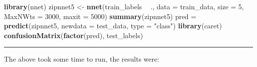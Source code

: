 \documentclass[]{article}
\newenvironment{Shaded}{\begin{snugshade}}{\end{snugshade}}
\newcommand{\KeywordTok}[1]{\textcolor[rgb]{0.13,0.29,0.53}{\textbf{#1}}}
\newcommand{\DataTypeTok}[1]{\textcolor[rgb]{0.13,0.29,0.53}{#1}}
\newcommand{\DecValTok}[1]{\textcolor[rgb]{0.00,0.00,0.81}{#1}}
\newcommand{\StringTok}[1]{\textcolor[rgb]{0.31,0.60,0.02}{#1}}
\newcommand{\OperatorTok}[1]{\textcolor[rgb]{0.81,0.36,0.00}{\textbf{#1}}}
\newcommand{\NormalTok}[1]{#1}
\begin{document}
\begin{Shaded}
\begin{Highlighting}[]
\KeywordTok{library}\NormalTok{(nnet)}
\NormalTok{zipnnet5 <-}\StringTok{ }\KeywordTok{nnet}\NormalTok{(train_labels }\OperatorTok{~}\StringTok{ }\NormalTok{., }\DataTypeTok{data =}\NormalTok{ train_data, }\DataTypeTok{size =} \DecValTok{5}\NormalTok{, }\DataTypeTok{MaxNWts =} \DecValTok{3000}\NormalTok{, }
    \DataTypeTok{maxit =} \DecValTok{5000}\NormalTok{)}
\KeywordTok{summary}\NormalTok{(zipnnet5)}
\NormalTok{pred =}\StringTok{ }\KeywordTok{predict}\NormalTok{(zipnnet5, }\DataTypeTok{newdata =}\NormalTok{ test_data, }\DataTypeTok{type =} \StringTok{"class"}\NormalTok{)}
\KeywordTok{library}\NormalTok{(caret)}
\KeywordTok{confusionMatrix}\NormalTok{(}\KeywordTok{factor}\NormalTok{(pred), test_labels)}
\end{Highlighting}
\end{Shaded}

\begin{center}\rule{0.5\linewidth}{\linethickness}\end{center}

The above took some time to run, the results were:
\end{document}
